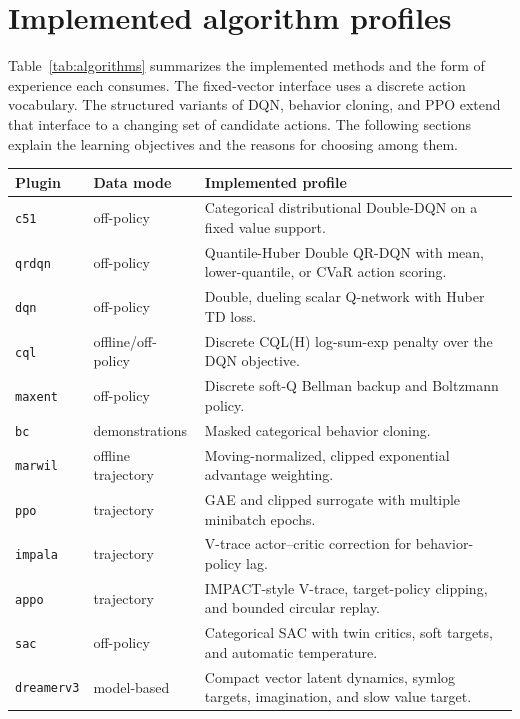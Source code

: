 \documentclass{strategynet-journal}
\begin{document}
\section{Implemented algorithm profiles}

Table~\ref{tab:algorithms} summarizes the implemented methods and the form of
experience each consumes. The fixed-vector interface uses a discrete action
vocabulary. The structured variants of DQN, behavior cloning, and PPO extend
that interface to a changing set of candidate actions. The following sections
explain the learning objectives and the reasons for choosing among them.

\begin{table}[H]
\centering
\scriptsize
\begin{tabularx}{\textwidth}{@{}P{0.13\textwidth}P{0.18\textwidth}X@{}}
\toprule
Plugin & Data mode & Implemented profile \\
\midrule
\texttt{c51} & off-policy & Categorical distributional Double-DQN on a fixed value support. \\
\texttt{qrdqn} & off-policy & Quantile-Huber Double QR-DQN with mean, lower-quantile, or CVaR action scoring. \\
\texttt{dqn} & off-policy & Double, dueling scalar Q-network with Huber TD loss. \\
\texttt{cql} & offline/off-policy & Discrete CQL(H) log-sum-exp penalty over the DQN objective. \\
\texttt{maxent} & off-policy & Discrete soft-Q Bellman backup and Boltzmann policy. \\
\texttt{bc} & demonstrations & Masked categorical behavior cloning. \\
\texttt{marwil} & offline trajectory & Moving-normalized, clipped exponential advantage weighting. \\
\texttt{ppo} & trajectory & GAE and clipped surrogate with multiple minibatch epochs. \\
\texttt{impala} & trajectory & V-trace actor--critic correction for behavior-policy lag. \\
\texttt{appo} & trajectory & IMPACT-style V-trace, target-policy clipping, and bounded circular replay. \\
\texttt{sac} & off-policy & Categorical SAC with twin critics, soft targets, and automatic temperature. \\
\texttt{dreamerv3} & model-based & Compact vector latent dynamics, symlog targets, imagination, and slow value target. \\

\end{tabularx}
\end{table}
\end{document}
